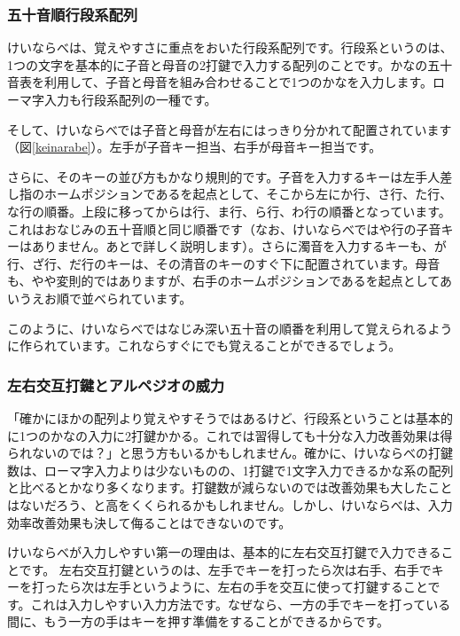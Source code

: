 \subsubsection*{五十音順行段系配列}

けいならべは、覚えやすさに重点をおいた行段系配列です。行段系というのは、1つの文字を基本的に子音と母音の2打鍵で入力する配列のことです。かなの五十音表を利用して、子音と母音を組み合わせることで1つのかなを入力します。ローマ字入力も行段系配列の一種です。

そして、けいならべでは子音と母音が左右にはっきり分かれて配置されています（図\ref{keinarabe}）。左手が子音キー担当、右手が母音キー担当です。

さらに、そのキーの並び方もかなり規則的です。子音を入力するキーは左手人差し指のホームポジションであるを起点として、そこから左にか行、さ行、た行、な行の順番。上段に移ってからは行、ま行、ら行、わ行の順番となっています。これはおなじみの五十音順と同じ順番です（なお、けいならべではや行の子音キーはありません。あとで詳しく説明します）。さらに濁音を入力するキーも、が行、ざ行、だ行のキーは、その清音のキーのすぐ下に配置されています。母音も、やや変則的ではありますが、右手のホームポジションであるを起点としてあいうえお順で並べられています。

このように、けいならべではなじみ深い五十音の順番を利用して覚えられるように作られています。これならすぐにでも覚えることができるでしょう。

\subsubsection*{左右交互打鍵とアルペジオの威力}

「確かにほかの配列より覚えやすそうではあるけど、行段系ということは基本的に1つのかなの入力に2打鍵かかる。これでは習得しても十分な入力改善効果は得られないのでは？」と思う方もいるかもしれません。確かに、けいならべの打鍵数は、ローマ字入力よりは少ないものの、1打鍵で1文字入力できるかな系の配列と比べるとかなり多くなります。打鍵数が減らないのでは改善効果も大したことはないだろう、と高をくくられるかもしれません。しかし、けいならべは、入力効率改善効果も決して侮ることはできないのです。

けいならべが入力しやすい第一の理由は、基本的に左右交互打鍵で入力できることです。
左右交互打鍵というのは、左手でキーを打ったら次は右手、右手でキーを打ったら次は左手というように、左右の手を交互に使って打鍵することです。これは入力しやすい入力方法です。なぜなら、一方の手でキーを打っている間に、もう一方の手はキーを押す準備をすることができるからです。

